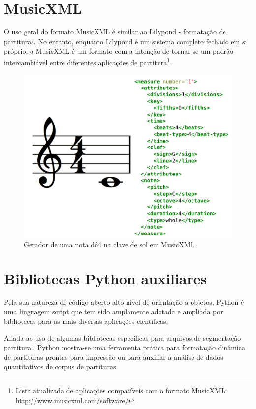 \documentclass[
	12pt,				%
	openright,			%
	twoside,			%
	a4paper,			%
	english,			%
	french,				%
	spanish,			%
	brazil				%
	]{abntex2}
\begin{document}
\section{MusicXML}

O uso geral do formato MusicXML é similar ao Lilypond - formatação de partituras. No entanto, enquanto Lilypond é um sistema completo fechado em si próprio, o MusicXML é um formato com a intenção de tornar-se um padrão intercambiável entre diferentes aplicações de partitura\footnote{ Lista atualizada de aplicações compatíveis com o formato MusicXML: \url{http://www.musicxml.com/software/} }.


\begin{figure}[htb]
	\caption{\label{fig_grafico}Gerador de uma nota dó4 na clave de sol em MusicXML}
	\begin{center}
	    \includegraphics[scale=0.5]{score/musicxml.pdf}
	\end{center}
\end{figure}

\pagebreak
\section{Bibliotecas Python auxiliares}

Pela sua natureza de código aberto alto-nível de orientação a objetos, Python\cite{van1995python} é uma linguagem script que tem sido amplamente adotada e ampliada por bibliotecas para as mais diversas aplicações científicas.\cite{downey2009python}

Aliada ao uso de algumas bibliotecas específicas para arquivos de segmentação partitural, Python mostra-se uma ferramenta prática para formatação dinâmica de partituras prontas para impressão ou para auxiliar a análise de dados quantitativos de corpus de partituras.
\end{document}
